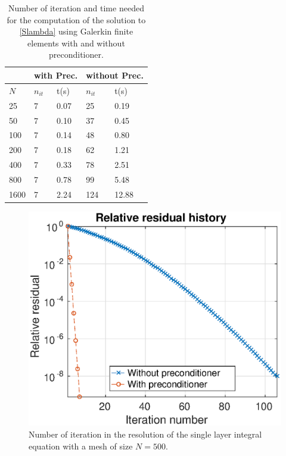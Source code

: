 \documentclass[a4paper]{article}
\begin{document}
\begin{table}
	\begin{center}
		\begin{tabular}{|| m{4em} | m{4em} | m{4em} | m{4em} | m{4em}||} 
			\hline
			\multicolumn{1}{||c|}{ }&
			\multicolumn{2}{c|}{with Prec.}&\multicolumn{2}{c||}{without Prec.}\\
			\hline
			$N$ & $n_{it}$& t(s) & $n_{it}$ & t(s)\\
			\hline\hline
			25 & 7 & 0.07 & 25 & 0.19\\ 
			\hline
			50 & 7 & 0.10 & 37 & 0.45\\
			\hline
			100 & 7 & 0.14 & 48 & 0.80\\
			\hline
			200 & 7 & 0.18 & 62 & 1.21\\
			\hline
			400 & 7 & 0.33 & 78 & 2.51\\
			\hline
			800 & 7 & 0.78 & 99 & 5.48\\
			\hline
			1600 & 7 & 2.24 & 124 & 12.88\\
			\hline
		\end{tabular}
	\end{center}
	\caption{Number of iteration and time needed for the computation of the solution to \eqref{Slambda} using Galerkin finite elements with and without preconditioner.}
	\label{TableNitTimeLaplaceDirichlet}
\end{table}




\begin{figure}
	\centering
	\includegraphics[scale=0.7]{PrecondLaplaceDirichletIterations}
	\caption{Number of iteration in the resolution of the single layer integral equation with a mesh of size $N = 500$.}
	\label{FigureNitLaplaceDirichlet}
\end{figure}
\end{document}
